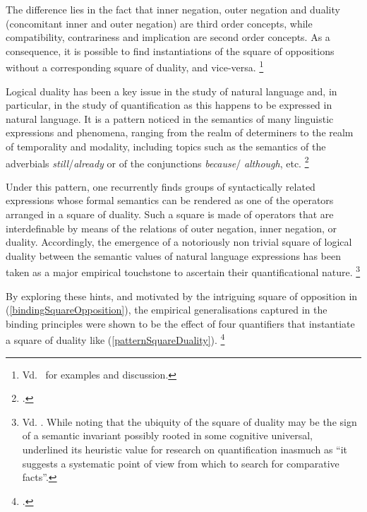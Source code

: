 \documentclass[output=paper
	        ,collection
	        ,collectionchapter
 	        ,biblatex
                ,babelshorthands
                ,newtxmath
                ,draftmode
                ,colorlinks, citecolor=brown
]{langscibook}
\begin{document}
The difference lies in the fact that inner negation, outer
negation and duality (concomitant inner and outer negation) are third order concepts, while compatibility, contrariness and
implication are second order concepts. As a consequence, it is possible
to find instantiations of the square of oppositions without a
corresponding square of duality, and vice-versa.%
\footnote{
Vd.~\citep{Lobner1987} for examples and discussion.
}


Logical duality has been a key issue in the study of natural language 
and, in particular, in the study of quantification as this happens to
be expressed in natural language.  It is a pattern noticed in the
semantics  of many linguistic expressions and phenomena, ranging from
the realm  of determiners to the realm of temporality and modality,
including topics  such as the semantics of the adverbials {\em
still}/{\em already} or of the conjunctions  {\em because}/{\em
although}, etc.%
\footnote{
\citep{Lobner1987, Lobner1989, Lobner1999, terMeulen1988, Konig1991, Smessaert1997}.
}

Under this pattern, one recurrently finds groups of syntactically related 
expressions whose formal semantics can be rendered as one of the operators
arranged in a square of duality. Such a square is made of operators that 
are interdefinable by means of the relations of outer negation, inner
negation, or duality.
Accordingly, 
the emergence of a notoriously non trivial square of logical duality
between the semantic values of natural language expressions has been taken 
as a major empirical touchstone to ascertain their quantificational nature.%
\footnote{
Vd. \citep{Lobner1987,vanBenthem1991}. While noting that the ubiquity of the square of duality 
may be the sign of a semantic invariant possibly rooted in some cognitive universal,  
\citep[]{vanBenthem1991} underlined its heuristic value for research
on quantification inasmuch as ``it suggests a systematic point of view from
which to search for comparative facts''.
}

By exploring these hints, and motivated by the intriguing square of opposition in (\ref{bindingSquareOpposition}), 
the empirical generalisations captured in the binding principles were shown to be the effect 
of four quantifiers that instantiate a square of duality like (\ref{patternSquareDuality}).%
\footnote{
\citep{branco:1998,branco:2001,branco:2005,branco:2006}.
}

\end{document}

